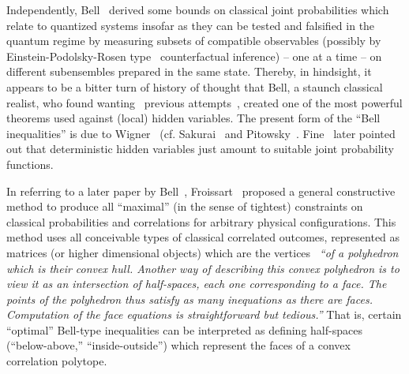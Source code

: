 Independently,
Bell~\cite{bell} derived some bounds on classical joint probabilities
which relate to quantized systems insofar as they can be tested and falsified in the quantum regime by measuring subsets
of compatible observables
(possibly by Einstein-Podolsky-Rosen type~\cite{epr} counterfactual inference) -- one at a time --
on different subensembles
prepared in the same state.
Thereby, in hindsight, it appears to be a bitter turn of history of thought that Bell, a staunch classical realist, who
found wanting~\cite{bell-66} previous attempts~\cite{v-neumann-49,v-neumann-55},
created one of the most powerful theorems used against (local) hidden variables.
The present form of the ``Bell inequalities'' is due to Wigner~\cite{wigner-70} (cf. Sakurai~\cite[p.~241-243]{Sakurai-1994} and  Pitowsky~\cite[Footnote~13]{pitowsky-89a}.
Fine~\cite{Fine-82} later pointed out that deterministic hidden variables
just amount to suitable joint probability functions.

In referring to a later paper by Bell~\cite{Bell-71}, Froissart~\cite{froissart-81,cirelson}
proposed a general constructive method to produce all ``maximal'' (in the sense of tightest)
constraints on classical probabilities and correlations for arbitrary physical configurations.
This method uses all conceivable types of classical correlated outcomes, represented as matrices (or higher dimensional objects)
which are the vertices~\cite[p.~243]{froissart-81}  {\em ``of a polyhedron which is their convex hull.
Another way of describing this convex polyhedron is to view it as an intersection
of half-spaces, each one corresponding to a face. The points of the
polyhedron thus satisfy as many inequations as there are faces. Computation
of the face equations is straightforward but tedious.''}
That is, certain ``optimal'' Bell-type inequalities can be interpreted as
defining half-spaces (``below-above,'' ``inside-outside'')
which represent the faces of a convex correlation polytope.

